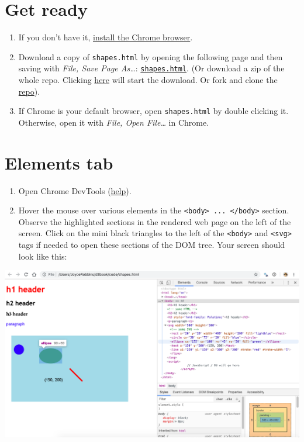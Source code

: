 \documentclass[
  openany]{book}
\begin{document}
\hypertarget{get-ready}{%
\section{\texorpdfstring{Get ready }{Get ready }}\label{get-ready}}

\begin{enumerate}
\def\labelenumi{\arabic{enumi}.}
\item
  If you don't have it, \href{https://www.google.com/chrome/}{install the Chrome browser}.
\item
  Download a copy of \texttt{shapes.html} by opening the following page and then saving with \emph{File, Save Page As\ldots{}}: \href{https://raw.githubusercontent.com/jtr13/d3book/master/code/shapes.html}{\texttt{shapes.html}}. (Or download a zip of the whole repo. Clicking \href{https://github.com/jtr13/d3book/archive/master.zip}{here} will start the download. Or fork and clone the \href{https://github.com/jtr13/d3book}{repo}).
\item
  If Chrome is your default browser, open \texttt{shapes.html} by double clicking it. Otherwise, open it with \emph{File, Open File\ldots{}} in Chrome.
\end{enumerate}

\hypertarget{elements-tab}{%
\section{\texorpdfstring{Elements tab }{Elements tab }}\label{elements-tab}}

\begin{enumerate}
\def\labelenumi{\arabic{enumi}.}
\item
  Open Chrome DevTools (\href{index.html\#javascript-console}{help}).
\item
  Hover the mouse over various elements in the \texttt{\textless{}body\textgreater{}\ ...\ \textless{}/body\textgreater{}} section. Observe the highlighted sections in the rendered web page on the left of the screen. Click on the mini black triangles to the left of the \texttt{\textless{}body\textgreater{}} and \texttt{\textless{}svg\textgreater{}} tags if needed to open these sections of the DOM tree. Your screen should look like this:
\end{enumerate}

\begin{center}\includegraphics[width=0.8\linewidth]{images/elements} \end{center}
\end{document}
